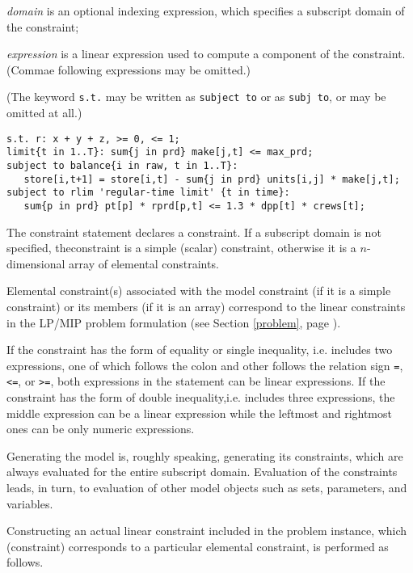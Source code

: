 \documentclass[11pt]{report}
\def\para#1{\noindent{\bf#1}}
\begin{document}
\noindent
{\it domain} is an optional indexing expression, which specifies
a subscript domain of the constraint;

\noindent
{\it expression} is a linear expression used to compute a component of
the constraint. (Commae following expressions may be omitted.)

\noindent
(The keyword {\tt s.t.} may be written as {\tt subject to} or as
{\tt subj to}, or may be omitted at all.)

\para{Examples}

\begin{verbatim}
s.t. r: x + y + z, >= 0, <= 1;
limit{t in 1..T}: sum{j in prd} make[j,t] <= max_prd;
subject to balance{i in raw, t in 1..T}:
   store[i,t+1] = store[i,t] - sum{j in prd} units[i,j] * make[j,t];
subject to rlim 'regular-time limit' {t in time}:
   sum{p in prd} pt[p] * rprd[p,t] <= 1.3 * dpp[t] * crews[t];
\end{verbatim}

The constraint statement declares a constraint. If a subscript domain
is not specified, the\linebreak constraint is a simple (scalar)
constraint, otherwise it is a $n$-dimensional array of elemental
constraints.

Elemental constraint(s) associated with the model constraint (if it is
a simple constraint) or its members (if it is an array) correspond to
the linear constraints in the LP/MIP problem formulation (see
Section \ref{problem}, page \pageref{problem}).

If the constraint has the form of equality or single inequality, i.e.
includes two expressions, one of which follows the colon and other
follows the relation sign {\tt=}, {\tt<=}, or {\tt>=}, both expressions
in the statement can be linear expressions. If the constraint has the
form of double inequality,\linebreak i.e. includes three expressions,
the middle expression can be a linear expression while the leftmost and
rightmost ones can be only numeric expressions.

Generating the model is, roughly speaking, generating its constraints,
which are always evaluated for the entire subscript domain. Evaluation
of the constraints leads, in turn, to evaluation of other model objects
such as sets, parameters, and variables.

Constructing an actual linear constraint included in the problem
instance, which (constraint) corresponds to a particular elemental
constraint, is performed as follows.
\end{document}
